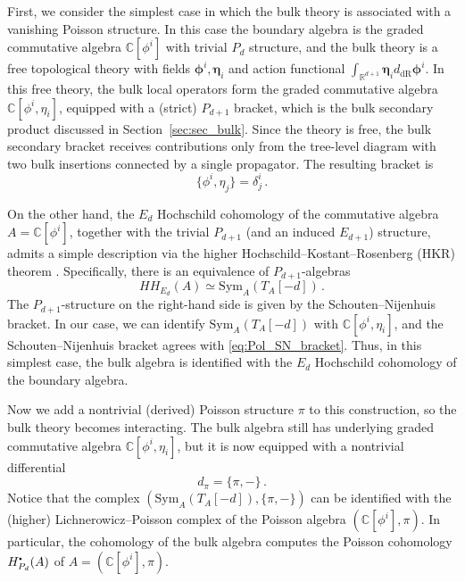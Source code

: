 \documentclass[11pt]{article}
\newcommand{\C}{\mathbb{C}}
\newcommand{\R}{\mathbb{R}}
\newcommand{\derham}{\mathrm{dR}}
\newcommand\sbullet[1][.5]{\mathbin{\vcenter{\hbox{\scalebox{#1}{$\bullet$}}}}}
\numberwithin{equation}{section}
\begin{document}
First, we consider the simplest case in which the bulk theory is associated with a vanishing Poisson structure. In this case the boundary algebra is the graded commutative algebra $\C[\phi^i]$ with trivial $P_d$ structure, and the bulk theory is a free topological theory with fields $\boldsymbol{\phi}^i,\boldsymbol{\eta}_i$ and action functional $\int_{\R^{d+1}}\boldsymbol{\eta}_id_{\derham}\boldsymbol{\phi}^i$. In this free theory, the bulk local operators form the graded commutative algebra $\C[\phi^i,\eta_i]$, equipped with a (strict) $P_{d+1}$ bracket, which is the bulk secondary product discussed in Section~\ref{sec:sec_bulk}. Since the theory is free, the bulk secondary bracket receives contributions only from the tree-level diagram with two bulk insertions connected by a single propagator. The resulting bracket is
\begin{equation}\label{eq:Pol_SN_bracket}
\{\phi^i,\eta_j\}=\delta^i_j\,.
\end{equation}

On the other hand, the $E_d$ Hochschild cohomology of the commutative algebra $A=\C[\phi^i]$, together with the trivial $P_{d+1}$ (and an induced $E_{d+1}$) structure, admits a simple description via the higher Hochschild--Kostant--Rosenberg (HKR) theorem \cite{calaque2015triviality,ginot2017}. Specifically, there is an equivalence of $P_{d+1}$-algebras
\begin{equation}
HH_{E_d}(A)\simeq \mathrm{Sym}_{A}(T_A[-d])\,.	
\end{equation}
The $P_{d+1}$-structure on the right-hand side is given by the Schouten--Nijenhuis bracket. In our case, we can identify $\mathrm{Sym}_{A}(T_A[-d])$ with $\C[\phi^i,\eta_i]$, and the Schouten--Nijenhuis bracket agrees with \ref{eq:Pol_SN_bracket}. Thus, in this simplest case, the bulk algebra is identified with the $E_d$ Hochschild cohomology of the boundary algebra.

Now we add a nontrivial (derived) Poisson structure $\pi$ to this construction, so the bulk theory becomes interacting. The bulk algebra still has underlying graded commutative algebra $\C[\phi^i,\eta_i]$, but it is now equipped with a nontrivial differential
\begin{equation}
d_\pi=\{\pi,-\}\,.
\end{equation}
Notice that the complex $(\mathrm{Sym}_{A}(T_A[-d]),\{\pi,-\})$ can be identified with the (higher) Lichnerowicz--Poisson complex of the Poisson algebra $(\C[\phi^i],\pi)$. In particular, the cohomology of the bulk algebra computes the Poisson cohomology $H_{P_d}^{\sbullet}(A)$ of $A=(\C[\phi^i],\pi)$.
\end{document}
